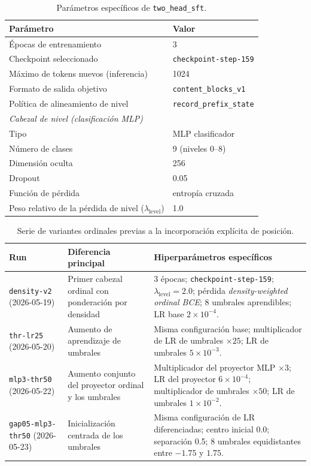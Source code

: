 \begin{table}[htbp]
\centering
\caption{Parámetros específicos de \texttt{two\_head\_sft}.}
\label{tab:AnexoA_twohead}
\begin{tabularx}{\textwidth}{p{}X}
\toprule
\textbf{Parámetro} & \textbf{Valor} \\
\midrule
Épocas de entrenamiento & 3 \\
Checkpoint seleccionado & \texttt{checkpoint-step-159} \\
Máximo de tokens nuevos (inferencia) & 1024 \\
Formato de salida objetivo & \texttt{content\_blocks\_v1} \\
Política de alineamiento de nivel & \texttt{record\_prefix\_state} \\
\midrule
\multicolumn{2}{l}{\textit{Cabezal de nivel (clasificación MLP)}} \\
Tipo & MLP clasificador \\
Número de clases & 9 (niveles 0--8) \\
Dimensión oculta & 256 \\
Dropout & 0.05 \\
Función de pérdida & entropía cruzada \\
Peso relativo de la pérdida de nivel ($\lambda_\text{level}$) & 1.0 \\
\bottomrule
\end{tabularx}
\end{table}

\begin{table}[htbp]
\centering
\small
\caption{Serie de variantes ordinales previas a la incorporación explícita de posición.}
\label{tab:AnexoA_ordinal_series}
\begin{tabularx}{\textwidth}{p{}p{}X}
\toprule
\textbf{Run} & \textbf{Diferencia principal} & \textbf{Hiperparámetros específicos} \\
\midrule
\texttt{density-v2} (2026-05-19) &
Primer cabezal ordinal con ponderación por densidad &
3 épocas; \texttt{checkpoint-step-159}; $\lambda_\text{level}=2.0$; pérdida \textit{density-weighted ordinal BCE}; 8 umbrales aprendibles; LR base $2\times10^{-4}$. \\
\texttt{thr-lr25} (2026-05-20) &
Aumento de aprendizaje de umbrales &
Misma configuración base; multiplicador de LR de umbrales $\times25$; LR de umbrales $5\times10^{-3}$. \\
\texttt{mlp3-thr50} (2026-05-22) &
Aumento conjunto del proyector ordinal y los umbrales &
Multiplicador del proyector MLP $\times3$; LR del proyector $6\times10^{-4}$; multiplicador de umbrales $\times50$; LR de umbrales $1\times10^{-2}$. \\
\texttt{gap05-mlp3-thr50} (2026-05-23) &
Inicialización centrada de los umbrales &
Misma configuración de LR diferenciadas; centro inicial 0.0; separación 0.5; 8 umbrales equidistantes entre $-1.75$ y $1.75$. \\
\bottomrule
\end{tabularx}
\end{table}


